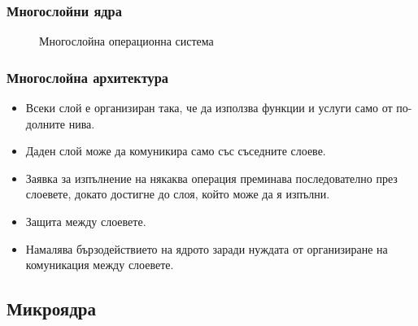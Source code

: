 \documentclass[ignorenonframetext, hyperref=unicode]{beamer}
\begin{document}
\begin{frame}
\frametitle{Многослойни ядра}
\begin{figure}[h]
\center
{}
\caption{Многослойна операционна система}
\end{figure}
\end{frame}

\begin{frame}
\frametitle{Многослойна архитектура}
\begin{itemize}
\item Всеки слой е организиран така, че да използва функции и услуги само от
по-долните нива.
\item Даден слой може да комуникира само със съседните слоеве.
\item Заявка за изпълнение на някаква операция преминава последователно през
слоевете, докато достигне до слоя, който може да я изпълни.
\item Защита между слоевете.
\item Намалява бързодействието на ядрото заради нуждата от организиране на
комуникация между слоевете.
\end{itemize}
\end{frame}

\subsection{Микроядра}
\end{document}
